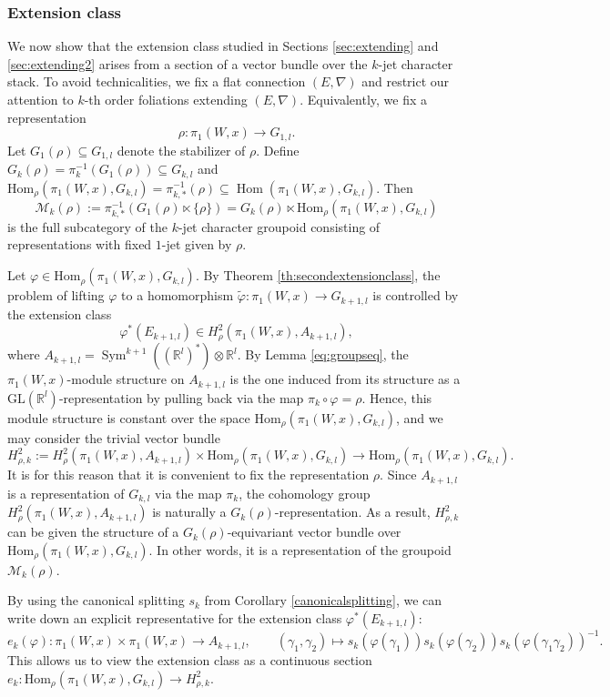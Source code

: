 \documentclass[10pt]{amsart}
\newcommand{\Hom}{\operatorname{Hom}}
\newcommand{\rr}{\mathbb{R}}
\DeclareMathOperator{\Sym}{Sym}
\numberwithin{theoremalpha}{section}
\numberwithin{equation}{section}
\numberwithin{definition}{section}
\numberwithin{theorem}{section}
\numberwithin{proposition}{section}
\numberwithin{lemma}{section}
\numberwithin{example}{section}
\numberwithin{remark}{section}
\numberwithin{corollary}{section}
\numberwithin{question}{section}
\numberwithin{problem}{section}
\numberwithin{assumption}{section}
\theoremstyle{named}
\numberwithin{equation}{section}
\begin{document}
\subsubsection{Extension class}
We now show that the extension class studied in Sections \ref{sec:extending} and \ref{sec:extending2} arises from a section of a vector bundle over the $k$-jet character stack. To avoid technicalities, we fix a flat connection $(E, \nabla)$ and restrict our attention to $k$-th order foliations extending $(E, \nabla)$. Equivalently, we fix a representation  
\[
\rho : \pi_{1}(W, x) \to G_{1, l}.
\]
Let $G_1(\rho) \subseteq G_{1, l}$ denote the stabilizer of $\rho$. Define $G_{k}(\rho) = \pi_{k}^{-1}(G_{1}(\rho)) \subseteq G_{k,l}$ and $\mathrm{Hom}_{\rho}(\pi_{1}(W,x), G_{k,l}) = \pi_{k,*}^{-1}(\rho) \subseteq \Hom(\pi_1(W, x), G_{k,l}) $. Then 
\[
\mathcal{M}_{k}(\rho) := \pi_{k, *}^{-1}(G_{1}(\rho) \ltimes \{ \rho \}) = G_{k}(\rho) \ltimes \mathrm{Hom}_{\rho}(\pi_{1}(W,x), G_{k,l})
\]
is the full subcategory of the $k$-jet character groupoid consisting of representations with fixed $1$-jet given by $\rho$. 

Let $\varphi \in \mathrm{Hom}_{\rho}(\pi_{1}(W,x), G_{k,l})$. By Theorem \ref{th:secondextensionclass}, the problem of lifting $\varphi$ to a homomorphism $\tilde{\varphi}: \pi_{1}(W,x) \to G_{k+1,l}$ is controlled by the extension class 
\[
\varphi^*(E_{k+1,l}) \in H_{\rho}^2(\pi_1(W,x),A_{k+1,l}),
\]
where $A_{k+1,l} = \Sym^{k+1}((\rr^{l})^*) \otimes \rr^l$. By Lemma \ref{eq:groupseq}, the $\pi_{1}(W,x)$-module structure on $A_{k+1,l} $ is the one induced from its structure as a $\mathrm{GL}(\mathbb{R}^l)$-representation by pulling back via the map $\pi_{k} \circ \varphi = \rho$. Hence, this module structure is constant over the space $\mathrm{Hom}_{\rho}(\pi_{1}(W,x), G_{k,l})$, and we may consider the trivial vector bundle 
\[
H^2_{\rho,k} := H_{\rho}^2(\pi_1(W,x),A_{k+1,l}) \times \mathrm{Hom}_{\rho}(\pi_{1}(W,x), G_{k,l}) \to \mathrm{Hom}_{\rho}(\pi_{1}(W,x), G_{k,l}). 
\]
It is for this reason that it is convenient to fix the representation $\rho$. Since $A_{k+1,l}$ is a representation of $G_{k,l}$ via the map $\pi_{k}$, the cohomology group $H_{\rho}^2(\pi_1(W,x),A_{k+1,l})$ is naturally a $G_{k}(\rho)$-representation. As a result, $H^2_{\rho,k}$ can be given the structure of a $G_{k}(\rho)$-equivariant vector bundle over $\mathrm{Hom}_{\rho}(\pi_{1}(W,x), G_{k,l})$. In other words, it is a representation of the groupoid $\mathcal{M}_{k}(\rho)$. 

By using the canonical splitting $s_{k}$ from Corollary \ref{canonicalsplitting}, we can write down an explicit representative for the extension class $\varphi^*(E_{k+1,l}) $: 
\[
e_{k}(\varphi) : \pi_{1}(W, x) \times \pi_{1}(W,x) \to A_{k+1, l}, \qquad (\gamma_1, \gamma_2) \mapsto s_{k}(\varphi(\gamma_1))s_{k}(\varphi(\gamma_2))s_{k}(\varphi(\gamma_1 \gamma_2))^{-1}.
\]
This allows us to view the extension class as a continuous section $e_{k} : \mathrm{Hom}_{\rho}(\pi_{1}(W,x), G_{k,l}) \to H^2_{\rho,k}$. 
\end{document}
